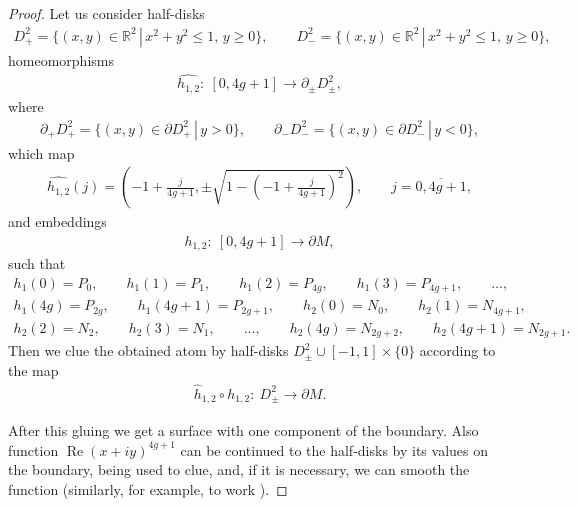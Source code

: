 \documentclass[pdftex]{sigma}
\numberwithin{equation}{section}
\begin{document}
\begin{proof}
Let us consider half-disks
\begin{gather*}
D^{2}_{+}=\big\{(x,y)\in{\mathbb R}^{2} \,|\, x^{2}+y^{2}\leq1, \,y\geq0\big\}, \qquad
D^{2}_{-}=\big\{(x,y)\in{\mathbb R}^2 \,|\, x^{2}+y^{2}\leq1,\, y\geq0\big\},
\end{gather*}
homeomorphisms
\begin{gather*}
\widehat{h_{1,2}}\colon \ [0,4g+1]\rightarrow \partial_{\pm}D^{2}_{\pm},
\end{gather*}
where
\begin{gather*}
\partial_{+}D^{2}_{+}=\big\{(x,y)\in\partial D^{2}_{+}\,|\,y>0\big \}, \qquad
\partial_{-}D^{2}_{-}=\big\{(x,y)\in\partial D^{2}_{-}\,|\,y<0\},
\end{gather*}
which map
\begin{gather*}
\widehat{h_{1,2}}(j)=\left(-1+\frac{j}{4g+1},\pm\sqrt{1-(-1+\frac{j}{4g+1})^{2}}\right),\qquad j=\overline{0,4g+1},
\end{gather*}
and embeddings
\begin{gather*}
h_{1,2}\colon \ [0,4g+1] \rightarrow \partial M,
\end{gather*}
such that
\begin{gather*}
h_{1}(0)=P_{0}, \qquad h_{1}(1)=P_{1}, \qquad h_{1}(2)=P_{4g}, \qquad h_{1}(3)=P_{4g+1}, \qquad \ldots, \\
h_{1}(4g)=P_{2g}, \qquad h_{1}(4g+1)=P_{2g+1}, \qquad h_{2}(0)=N_{0}, \qquad h_{2}(1)=N_{4g+1},\\
h_{2}(2)=N_{2}, \qquad h_{2}(3)=N_{1}, \qquad \ldots, \qquad h_{2}(4g)=N_{2g+2}, \qquad h_{2}(4g+1)=N_{2g+1}.
\end{gather*}
Then we clue the obtained atom by half-disks $D^{2}_{\pm}\cup[-1,1]\times\{0\}$ according to the map
\begin{gather*}
\widehat{h}_{1,2} \circ h_{1,2}\colon \ D^{2}_{\pm} \rightarrow \partial M.
\end{gather*}

After this gluing we get a surface with one component of the boundary. Also function $\operatorname{Re}(x+iy)^{4g+1}$ can be continued to the half-disks by its values on the boundary, being used to clue, and, if it is necessary, we can smooth the function (similarly, for example, to work \cite[Section~5]{Konner/Floid}).


\end{proof}
\end{document}
